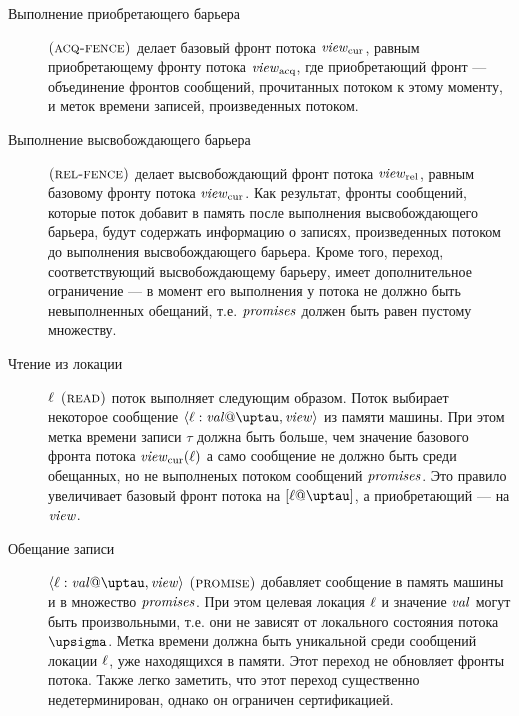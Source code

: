 \begin{description}
  \item[Выполнение приобретающего барьера] $\textsc{(acq-fence)}$
    делает базовый фронт потока $\mathit{view}_{\mathrm{cur}}$, равным приобретающему фронту потока $\mathit{view}_{\mathrm{acq}}$,
    где приобретающий фронт --- объединение фронтов сообщений, прочитанных потоком к этому моменту, и меток времени записей,
    произведенных потоком.

  \item[Выполнение высвобождающего барьера] $\textsc{(rel-fence)}$
    делает высвобождающий фронт потока $\mathit{view}_{\mathrm{rel}}$, равным базовому фронту потока $\mathit{view}_{\mathrm{cur}}$.
    Как результат, фронты сообщений, которые поток добавит в память после выполнения высвобождающего барьера, будут содержать
    информацию о записях, произведенных потоком до выполнения высвобождающего барьера.%
    Кроме того, переход, соответствующий высвобождающему барьеру, имеет дополнительное ограничение --- в момент его выполнения
    у потока не должно быть невыполненных обещаний, т.е. $\mathit{promises}$ должен быть равен пустому множеству.
  
  \item[Чтение из локации] $\ell$ $\textsc{(read)}$ поток выполняет следующим образом. Поток выбирает некоторое сообщение
    $\writeEvt{\loc}{\stval}{\tau}{\R}$ из памяти машины. При этом метка времени записи $\tau$ должна
    быть больше, чем значение базового фронта потока $\mathit{view}_{\mathrm{cur}}(\ell)$ а само сообщение не должно быть
    среди обещанных, но не выполненых потоком сообщений $\mathit{promises}$.
    Это правило увеличивает базовый фронт потока на $[\loc@\tau]$, а приобретающий --- на $\mathit{view}$.
    
  \item[Обещание записи] $\writeEvt{\loc}{\stval}{\tau}{\R}$ $\textsc{(promise)}$ добавляет сообщение в память машины и
    в множество $\mathit{promises}$. При этом целевая локация $\ell$ и значение $\mathit{val}$ могут быть
    произвольными, т.е. они не зависят от локального состояния потока $\pstate$.
    Метка времени должна быть уникальной среди сообщений локации $\ell$, уже находящихся в памяти.
    Этот переход не обновляет фронты потока. Также легко заметить, что этот переход существенно
    недетерминирован, однако он ограничен сертификацией.
    

\end{description}
